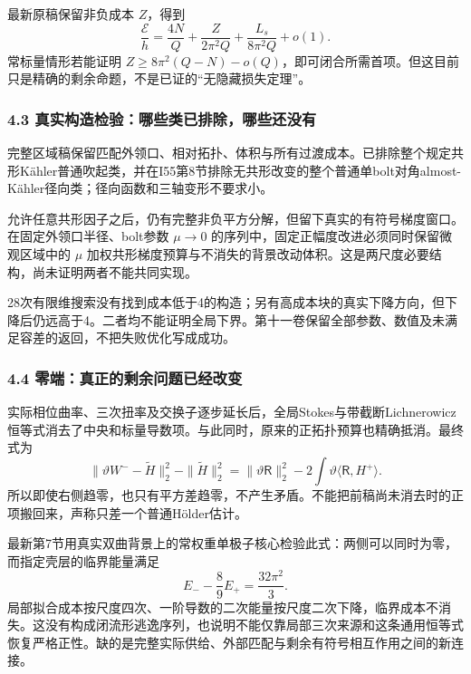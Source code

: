 \documentclass[
  10pt,
]{article}
\begin{document}
最新原稿保留非负成本 \(Z\)，得到 \[
\frac{\mathcal E}{h}
=\frac{4N}{Q}+\frac{Z}{2\pi^2Q}
 +\frac{L_s}{8\pi^2Q}+o(1).
\] 常标量情形若能证明
\(Z\ge8\pi^2(Q-N)-o(Q)\)，即可闭合所需首项。但这目前只是精确的剩余命题，不是已证的``无隐藏损失定理''。

\hypertarget{ux771fux5b9eux6784ux9020ux68c0ux9a8cux54eaux4e9bux7c7bux5df2ux6392ux9664ux54eaux4e9bux8fd8ux6ca1ux6709}{%
\subsubsection{4.3
真实构造检验：哪些类已排除，哪些还没有}\label{ux771fux5b9eux6784ux9020ux68c0ux9a8cux54eaux4e9bux7c7bux5df2ux6392ux9664ux54eaux4e9bux8fd8ux6ca1ux6709}}

完整区域稿保留匹配外领口、相对拓扑、体积与所有过渡成本。已排除整个规定共形Kähler普通吹起类，并在I55第8节排除无共形改变的整个普通单bolt对角almost-Kähler径向类；径向函数和三轴变形不要求小。

允许任意共形因子之后，仍有完整非负平方分解，但留下真实的有符号梯度窗口。在固定外领口半径、bolt参数
\(\mu\to0\) 的序列中，固定正幅度改进必须同时保留微观区域中的 \(\mu\)
加权共形梯度预算与不消失的背景改动体积。这是两尺度必要结构，尚未证明两者不能共同实现。

28次有限维搜索没有找到成本低于4的构造；另有高成本块的真实下降方向，但下降后仍远高于4。二者均不能证明全局下界。第十一卷保留全部参数、数值及未满足容差的返回，不把失败优化写成成功。

\hypertarget{ux96f6ux7aefux771fux6b63ux7684ux5269ux4f59ux95eeux9898ux5df2ux7ecfux6539ux53d8}{%
\subsubsection{4.4
零端：真正的剩余问题已经改变}\label{ux96f6ux7aefux771fux6b63ux7684ux5269ux4f59ux95eeux9898ux5df2ux7ecfux6539ux53d8}}

实际相位曲率、三次扭率及交换子逐步延长后，全局Stokes与带截断Lichnerowicz恒等式消去了中央和标量导数项。与此同时，原来的正拓扑预算也精确抵消。最终式为
\[
\|\vartheta W^- -\widetilde H\|_2^2-\|\widetilde H\|_2^2
=\|\vartheta\mathsf R\|_2^2
-2\int\vartheta\langle\mathsf R,H^+\rangle.
\]
所以即使右侧趋零，也只有平方差趋零，不产生矛盾。不能把前稿尚未消去时的正项搬回来，声称只差一个普通Hölder估计。

最新第7节用真实双曲背景上的常权重单极子核心检验此式：两侧可以同时为零，而指定壳层的临界能量满足
\[
E_- -\frac89 E_+=\frac{32\pi^2}{3}.
\]
局部拟合成本按尺度四次、一阶导数的二次能量按尺度二次下降，临界成本不消失。这没有构成闭流形逃逸序列，也说明不能仅靠局部三次来源和这条通用恒等式恢复严格正性。缺的是完整实际供给、外部匹配与剩余有符号相互作用之间的新连接。
\end{document}
